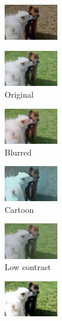 \begin{figure}[ht]
\begin{subfigure}[b]{0.1\textwidth}
	\end{subfigure}
	\hfill
	\begin{subfigure}[b]{0.1\textwidth}
		\includegraphics[width=2.4cm]{orig - filter - lumin (2).jpeg}
		
	\end{subfigure}
	
	\vspace{0.1cm}	
	\begin{subfigure}[b]{0.1\textwidth}
		\centering
		\includegraphics[width=2.4cm]{c - filter.jpeg}
		\caption{Original}
	\end{subfigure}
	\hfill
	\begin{subfigure}[b]{0.1\textwidth}
		\includegraphics[width=2.4cm]{c - filter - blurr.jpeg}
		\caption{Blurred}
	\end{subfigure}
	\hfill
	\begin{subfigure}[b]{0.1\textwidth}
		\includegraphics[width=2.4cm]{c - filter - cartoon.jpeg}
		\caption{Cartoon}
	\end{subfigure}
	\hfill
	\begin{subfigure}[b]{0.1\textwidth}
		\includegraphics[width=2.4cm]{c - filter - man contr (1).jpg}
		\caption{Low contrast}
	\end{subfigure}
	\hfill
	\begin{subfigure}[b]{0.1\textwidth}
		\includegraphics[width=2.4cm]{c - filter - man contr (2).jpg}

\end{subfigure}
\end{figure}
